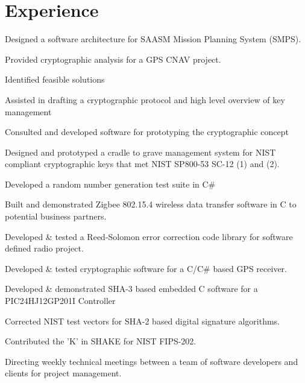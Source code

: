 \documentclass[letterpaper]{deedy-resume} %
\begin{document}
\begin{minipage}[t]{0.66\textwidth} %


\section{Experience}


\vspace{\topsep} %
\begin{tightitemize}
\item Designed a software architecture for SAASM Mission Planning System (SMPS).
\item Provided cryptographic analysis for a GPS CNAV project.
\begin{tightitemize}
\item Identified feasible solutions
\item Assisted in drafting a cryptographic protocol and high level overview of key management
\item Consulted and developed software for prototyping the cryptographic concept
\end{tightitemize}
\item Designed and prototyped a cradle to grave management system for NIST compliant cryptographic keys that met NIST SP800-53 SC-12 (1) and (2).
\item Developed a random number generation test suite in C\#
\item Built and demonstrated Zigbee 802.15.4 wireless data transfer software in C to potential business partners.
\item Developed \& tested a Reed-Solomon error correction code library for software defined radio project.
\item Developed \& tested cryptographic software for a C/C\# based GPS receiver.
\item Developed \& demonstrated SHA-3 based embedded C software for a PIC24HJ12GP201I Controller
\item Corrected NIST test vectors for SHA-2 based digital signature algorithms.
\item Contributed the 'K' in SHAKE for NIST FIPS-202.
\item Directing weekly technical meetings between a team of software developers and clients for project management.
\end{tightitemize}


\end{minipage}
\end{document}
